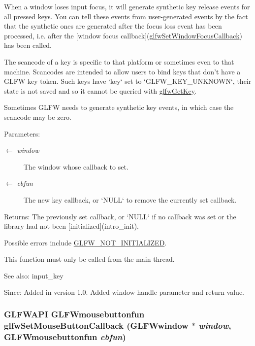 When a window loses input focus, it will generate synthetic key release events for all pressed keys. You can tell these events from user-generated events by the fact that the synthetic ones are generated after the focus loss event has been processed, i.e. after the \mbox{[}window focus callback\mbox{]}(\hyperlink{group__window_gc89c6534ba7fbab6f6c68b855656c0d4}{glfwSetWindowFocusCallback}) has been called.

The scancode of a key is specific to that platform or sometimes even to that machine. Scancodes are intended to allow users to bind keys that don't have a GLFW key token. Such keys have `key` set to `GLFW\_\-KEY\_\-UNKNOWN`, their state is not saved and so it cannot be queried with \hyperlink{group__input_g7d8ad8ffaf272808f04e1d5d33ec8859}{glfwGetKey}.

Sometimes GLFW needs to generate synthetic key events, in which case the scancode may be zero.

\begin{Desc}
\item[Parameters:]
\begin{description}
\item[\mbox{$\leftarrow$} {\em window}]The window whose callback to set. \item[\mbox{$\leftarrow$} {\em cbfun}]The new key callback, or `NULL` to remove the currently set callback. \end{description}
\end{Desc}
\begin{Desc}
\item[Returns:]The previously set callback, or `NULL` if no callback was set or the library had not been \mbox{[}initialized\mbox{]}(intro\_\-init).\end{Desc}
Possible errors include \hyperlink{group__errors_g2374ee02c177f12e1fa76ff3ed15e14a}{GLFW\_\-NOT\_\-INITIALIZED}.

This function must only be called from the main thread.

\begin{Desc}
\item[See also:]input\_\-key\end{Desc}
\begin{Desc}
\item[Since:]Added in version 1.0.  Added window handle parameter and return value. \end{Desc}
\hypertarget{group__input_g20e5ba1ce4e086aedd48a06dc311c95f}{
\subsubsection[glfwSetMouseButtonCallback]{\setlength{\rightskip}{0pt plus 5cm}GLFWAPI {\bf GLFWmousebuttonfun} glfwSetMouseButtonCallback ({\bf GLFWwindow} $\ast$ {\em window}, \/  {\bf GLFWmousebuttonfun} {\em cbfun})}}
\label{group__input_g20e5ba1ce4e086aedd48a06dc311c95f}


